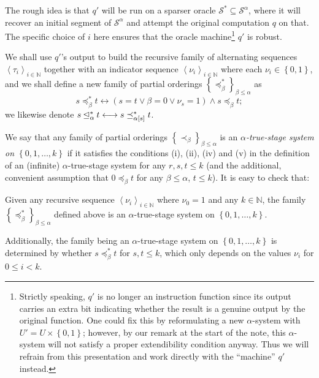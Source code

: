 \documentclass[11pt]{article}
\theoremstyle{plain}
\theoremstyle{definition}
\newcommand{\tuple}[1]{\left\langle #1 \right\rangle}
\begin{document}
The rough idea is that $q'$ will be run on a sparser oracle $\mathcal{S}^* \subseteq \mathcal{S}^\alpha$, where it will recover an initial segment of $\mathcal{S}^\alpha$ and attempt the original computation $q$ on that. The specific choice of $i$ here ensures that the oracle machine\footnote{Strictly speaking, $q'$ is no longer an instruction function since its output carries an extra bit indicating whether the result is a genuine output by the original function. One could fix this by reformulating a new $\alpha$-system with $U' = U \times \left\{0, 1\right\}$; however, by our remark at the start of the note, this $\alpha$-system will not satisfy a proper extendibility condition anyway. Thus we will refrain from this presentation and work directly with the ``machine'' $q'$ instead.} $q'$ is robust.

We shall use $q'$'s output to build the recursive family of alternating sequences $\tuple{\tau_i}_{i \in \mathbb{N}}$ together with an indicator sequence $\tuple{\nu_i}_{i \in \mathbb{N}}$ where each $\nu_i \in \left\{0, 1\right\}$, and we shall define a new family of partial orderings $\left\{\preceq_\beta^*\right\}_{\beta \leq \alpha}$ as
\[s \preceq_\beta^* t \longleftrightarrow \left(s = t \lor \beta = 0 \lor \nu_s = 1\right) \land s \preceq_\beta t;\]
we likewise denote $s \unlhd_\alpha^* t \longleftrightarrow s \preceq_{\alpha\mleft[s\mright]}^* t$.

We say that any family of partial orderings $\left\{\prec_\beta\right\}_{\beta \leq \alpha}$ is an \emph{$\alpha$-true-stage system on $\left\{0, 1, \ldots, k\right\}$} if it satisfies the conditions (i), (ii), (iv) and (v) in the definition of an (infinite) $\alpha$-true-stage system for any $r, s, t \leq k$ (and the additional, convenient assumption that $0 \preceq_\beta t$ for any $\beta \leq \alpha$, $t \leq k$). It is easy to check that:

\begin{lemma}
  \label{lem:ts-segment}
  Given any recursive sequence $\tuple{\nu_i}_{i \in \mathbb{N}}$ where $\nu_0 = 1$ and any $k \in \mathbb{N}$, the family $\left\{\preceq_\beta^*\right\}_{\beta \leq \alpha}$ defined above is an $\alpha$-true-stage system on $\left\{0, 1, \ldots, k\right\}$.

  Additionally, the family being an $\alpha$-true-stage system on $\left\{0, 1, \ldots, k\right\}$ is determined by whether $s \preceq_\beta^* t$ for $s, t \leq k$, which only depends on the values $\nu_i$ for $0 \leq i < k$.
\end{lemma}
\end{document}
